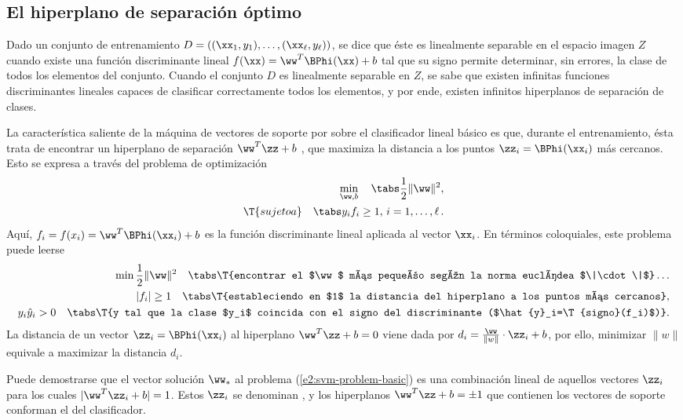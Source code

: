 %
%
\subsection{El hiperplano de separación óptimo}
%
Dado un conjunto de entrenamiento
$D=\left((\xx_1,y_1),\ldots,(\xx_\ell,y_\ell)\right)$, se dice que
éste es linealmente separable en el espacio imagen $Z$ cuando existe
una función discriminante lineal $f(\xx)=\ww^T\BPhi(\xx)+b$ tal que su
signo permite determinar, sin errores, la clase de todos los elementos
del conjunto.
Cuando el conjunto $D$ es linealmente separable en $Z$, se sabe que
existen infinitas funciones discriminantes lineales capaces de
clasificar correctamente todos los elementos, y por ende, existen
infinitos hiperplanos de separación de clases.

La característica saliente de la máquina de vectores de soporte por
sobre el clasificador lineal básico es que, durante el entrenamiento,
ésta trata de encontrar un hiperplano de separación $\ww^T\zz+b$
, que maximiza la distancia a los puntos
$\zz_i=\BPhi(\xx_i)$ más cercanos. Esto se expresa a través del
problema de optimización
%
\begin{align}\label{e2:svm-problem-basic}
  \begin{split}
    \min_{\ww,b} \quad\tabs \frac{1}{2}\|\ww\|^2, \\
    \T{sujeto a}\quad\tabs y_i f_i\geq1,\,i=1,\ldots,\ell\,.
  \end{split}
\end{align}
%
Aquí, $f_i=f(x_i)=\ww^T\BPhi(\xx_i)+b$ es la función discriminante
lineal aplicada al vector $\xx_i$. En términos coloquiales, este
problema puede leerse
%
\begin{align*}
  \begin{split}
    \min \frac{1}{2}\|\ww\|^2 \quad \tabs \T{encontrar el $\ww$ más
      pequeño según la norma euclídea $\|\cdot\|$}\ldots\\
    |f_i|\geq1 \quad \tabs \T{estableciendo en $1$ la distancia del
      hiperplano a los puntos más cercanos},\\
    y_i\hat{y}_i>0\quad \tabs \T{y tal que la clase $y_i$ coincida con el
      signo del discriminante ($\hat{y}_i=\T{signo}(f_i)$)}.
  \end{split}
\end{align*}
%
La distancia de un vector $\zz_i=\BPhi(\xx_i)$ al hiperplano
$\ww^T\zz+b=0$ viene dada por $d_i=\frac{\ww}{\|w\|}\cdot\zz_i+b$, por
ello, minimizar $\|w\|$ equivale a maximizar la distancia $d_i$.

Puede demostrarse que el vector solución $\ww_*$ al problema
(\ref{e2:svm-problem-basic}) es una combinación lineal de aquellos
vectores $\zz_i$ para los cuales $|\ww^T\zz_i+b|=1$. Estos $\zz_i$ se
denominan , y los hiperplanos $\ww^T\zz+b=\pm1$
que contienen los vectores de soporte conforman el  del
clasificador.

